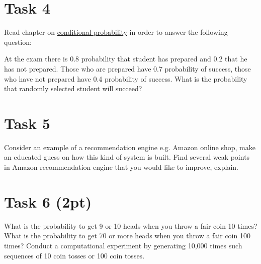 \documentclass{article}
\begin{document}
\section*{Task 4}
Read chapter on \href{http://mathwiki.cs.ut.ee/probability/02_multiple_event_probability}{conditional probability} in order to answer the following question:
\begin{framed}
At the exam there is 0.8 probability that student has prepared and 0.2 that he has not prepared. Those who are prepared have 0.7 probability of success, those who have not prepared have 0.4 probability of success. What is the probability that randomly selected student will succeed?
\end{framed}
\section*{Task 5}
Consider an example of a recommendation engine e.g. Amazon online shop, make an educated guess on how this kind of system is built. Find several weak points in Amazon recommendation engine that you would like to improve, explain.

\section*{Task 6 (2pt)}
What is the probability to get 9 or 10 heads when you throw a fair coin 10 times? What is the probability to get 70 or more heads when you throw a fair coin 100 times? Conduct a computational experiment by generating 10,000 times such sequences of 10 coin tosses or 100 coin tosses.
\end{document}
